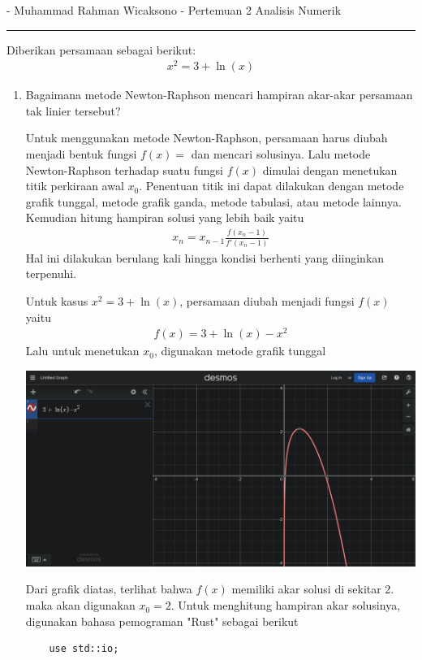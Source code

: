 \documentclass[12pt]{article}
\begin{document}
{}
\newcommand{\unt}{\int\displaylimits}
\newcommand{\jadi}{$\therefore\;$}
\newcommand{\rut}[1]{\sqrt{#1}}
\newcommand{\jgj}{\Leftrightarrow}
\newcommand{\tebal}[1]{\underline{\textbf{#1}}\bigskip}
\newcommand{\infak}{\int\displaylimits^{\infty}_{\infty}}
\newcommand{\lqm}{\lim\displaylimits}

\sloppy

 - Muhammad Rahman Wicaksono - Pertemuan 2 Analisis Numerik\\
\noindent\rule{\textwidth}{0.2pt}\bigbreak

Diberikan persamaan sebagai berikut:
\begin{align*}
    x^2 = 3 + \ln(x)
\end{align*}
\begin{enumerate}
    \item {
        Bagaimana metode Newton-Raphson mencari hampiran akar-akar persamaan tak linier tersebut?\bigskip

        Untuk menggunakan metode Newton-Raphson, persamaan harus diubah menjadi bentuk fungsi $ f(x) = $ dan mencari solusinya. Lalu metode Newton-Raphson terhadap suatu fungsi $ f(x) $ dimulai dengan menetukan titik perkiraan awal $ x_0 $. Penentuan titik ini dapat dilakukan dengan metode grafik tunggal, metode grafik ganda, metode tabulasi, atau metode lainnya. Kemudian hitung hampiran solusi yang lebih baik yaitu
        \begin{align*}
            x_n = x_{n-1}\frac{f(x_n-1)}{f'(x_n-1)}
        \end{align*}
        Hal ini dilakukan berulang kali hingga kondisi berhenti yang diinginkan terpenuhi.\bigskip

        Untuk kasus $ x^2 = 3 + \ln(x) $, persamaan diubah menjadi fungsi $ f(x) $ yaitu
        \begin{align*}
            f(x) = 3 + \ln(x) - x^2
        \end{align*}
        Lalu untuk menetukan $ x_0 $, digunakan metode grafik tunggal
        \begin{center}
        \includegraphics[scale = 0.2]{Screenshot 2023-09-13 at 23-13-48 Desmos Graphing Calculator.png}
        \end{center}
        Dari grafik diatas, terlihat bahwa $ f(x) $ memiliki akar solusi di sekitar 2. maka akan digunakan $ x_0 = 2 $. Untuk menghitung hampiran akar solusinya, digunakan bahasa pemograman "Rust" sebagai berikut
        \begin{lstlisting}
    use std::io;


\end{lstlisting}}
\end{enumerate}
\end{document}
